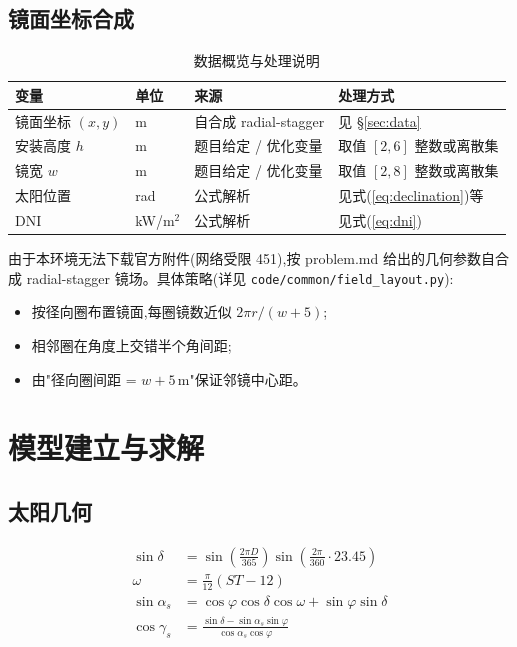 \documentclass[UTF8,a4paper,12pt]{ctexart}
\begin{document}
\subsection{镜面坐标合成}
\begin{table}[H]
  \centering
  \caption{数据概览与处理说明}
  \label{tab:data-overview}
  \begin{tabular}{llll}
    \toprule
    变量 & 单位 & 来源 & 处理方式 \\
    \midrule
    镜面坐标 $(x,y)$ & m & 自合成 radial-stagger & 见 §\ref{sec:data} \\
    安装高度 $h$ & m & 题目给定 / 优化变量 & 取值 $[2,6]$ 整数或离散集 \\
    镜宽 $w$ & m & 题目给定 / 优化变量 & 取值 $[2,8]$ 整数或离散集 \\
    太阳位置 & rad & 公式解析 & 见式(\ref{eq:declination})等 \\
    DNI & kW/m$^2$ & 公式解析 & 见式(\ref{eq:dni}) \\
    \bottomrule
  \end{tabular}
\end{table}

由于本环境无法下载官方附件(网络受限 451),按 problem.md 给出的几何参数自合成 radial-stagger 镜场。具体策略(详见 \texttt{code/common/field\_layout.py}):
\begin{itemize}[leftmargin=2em]
  \item 按径向圈布置镜面,每圈镜数近似 $2\pi r/(w+5)$;
  \item 相邻圈在角度上交错半个角间距;
  \item 由"径向圈间距 = $w+5$\,m"保证邻镜中心距。
\end{itemize}

\section{模型建立与求解}

\subsection{太阳几何}
\begin{subequations}
\label{eq:sun}
\begin{align}
\sin\delta &= \sin\left(\frac{2\pi D}{365}\right) \sin\left(\frac{2\pi}{360}\cdot 23.45\right) \label{eq:declination}\\
\omega &= \frac{\pi}{12}(ST - 12)\\
\sin\alpha_s &= \cos\varphi\cos\delta\cos\omega + \sin\varphi\sin\delta\\
\cos\gamma_s &= \frac{\sin\delta - \sin\alpha_s\sin\varphi}{\cos\alpha_s\cos\varphi}
\end{align}
\end{subequations}
\end{document}
